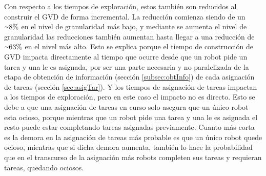 
Con respecto a los tiempos de exploración, estos también son reducidos al
construir el GVD de forma incremental. La reducción comienza siendo de un
${\smallsim}8\%$ en el nivel de granularidad más bajo, y mediante se aumenta el
nivel de granularidad las reducciones también aumentan hasta llegar a una
reducción de ${\smallsim}63\%$ en el nivel más alto. Esto se explica porque el
tiempo de construcción de GVD impacta directamente al tiempo que ocurre desde
que un robot pide un tarea y una le es asignada, por ser una parte necesaria y
no paralelizada de la etapa de obtención de información (sección
\ref{subsec:obtInfo}) de cada asignación de tareas (sección \ref{sec:asigTar}).
Y los tiempos de asignación de tareas impactan a los tiempos de exploración,
pero en este caso el impacto no es directo. Esto se debe a que una asignación
de tareas en curso solo asegura que un único robot esta ocioso, porque
mientras que un robot pide una tarea y una le es asignada el resto puede estar
completando tareas asignadas previamente. Cuanto más corta es la demora en la
asignación de tareas más probable es que un único robot quede ocioso, mientras
que si dicha demora aumenta, también lo hace la probabilidad que en el
transcurso de la asignación más robots completen sus tareas y requieran tareas,
quedando ociosos. 

